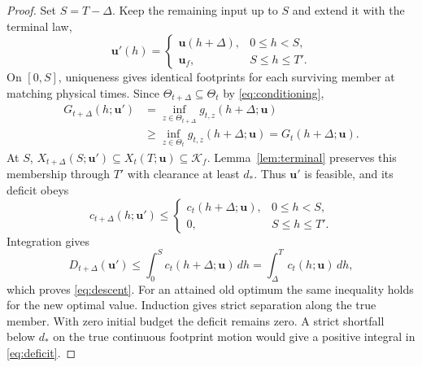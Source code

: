 \documentclass[journal]{IEEEtran}
\theoremstyle{definition}
\newcommand{\vct}[1]{\boldsymbol{#1}}
\begin{document}
\begin{proof}
Set $S=T-\Delta$. Keep the remaining input up to $S$ and extend it
with the terminal law,
\begin{equation*}
 \vct u'(h)=\begin{cases}
    \vct u(h+\Delta),&0\le h<S,\\
    \vct u_f,&S\le h\le T'.
 \end{cases}
\end{equation*}
On $[0,S]$, uniqueness gives identical footprints for each surviving
member at matching physical times. Since
$\Theta_{t+\Delta}\subseteq\Theta_t$ by \eqref{eq:conditioning},
\begin{equation*}
\begin{aligned}
 G_{t+\Delta}(h;\vct u')
 &=\inf_{z\in\Theta_{t+\Delta}}g_{t,z}(h+\Delta;\vct u)\\
 &\ge \inf_{z\in\Theta_t}g_{t,z}(h+\Delta;\vct u)
 =G_t(h+\Delta;\vct u).
\end{aligned}
\end{equation*}
At $S$, $X_{t+\Delta}(S;\vct u')\subseteq X_t(T;\vct u)\subseteq
\mathcal K_f$. Lemma~\ref{lem:terminal} preserves this membership
through $T'$ with clearance at least $d_*$. Thus $\vct u'$ is feasible,
and its deficit obeys
\begin{equation*}
 c_{t+\Delta}(h;\vct u')\le
 \begin{cases}
 c_t(h+\Delta;\vct u),&0\le h<S,\\
 0,&S\le h\le T'.
 \end{cases}
\end{equation*}
Integration gives
\begin{equation*}
 D_{t+\Delta}(\vct u')\le\int_0^S c_t(h+\Delta;\vct u)\,dh
                         =\int_\Delta^T c_t(h;\vct u)\,dh ,
\end{equation*}
which proves \eqref{eq:descent}. For an attained old optimum the same
inequality holds for the new optimal value. Induction gives strict
separation along the true member. With zero initial budget the deficit
remains zero. A strict shortfall below $d_*$ on the true continuous
footprint motion would give a positive integral in \eqref{eq:deficit}.
\end{proof}
\end{document}
